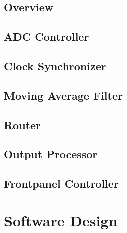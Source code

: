 \documentclass[11pt]{article}
\begin{document}
\subsection{Overview}

\subsection{ADC Controller}

\subsection{Clock Synchronizer}

\subsection{Moving Average Filter}

\subsection{Router}

\subsection{Output Processor}

\subsection{Frontpanel Controller}


\section{Software Design}
\end{document}
